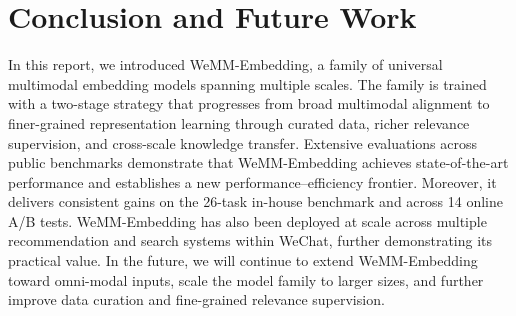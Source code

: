 \documentclass[]{wechat}
\begin{document}
\section{Conclusion and Future Work}
\label{sec:conclusion}

In this report, we introduced WeMM-Embedding, a family of universal multimodal embedding models spanning multiple scales. The family is trained with a two-stage strategy that progresses from broad multimodal alignment to finer-grained representation learning through curated data, richer relevance supervision, and cross-scale knowledge transfer. Extensive evaluations across public benchmarks demonstrate that WeMM-Embedding achieves state-of-the-art performance and establishes a new performance--efficiency frontier. Moreover, it delivers consistent gains on the 26-task in-house benchmark and across 14 online A/B tests. WeMM-Embedding has also been deployed at scale across multiple recommendation and search systems within WeChat, further demonstrating its practical value. In the future, we will continue to extend WeMM-Embedding toward omni-modal inputs, scale the model family to larger sizes, and further improve data curation and fine-grained relevance supervision.





\end{document}

